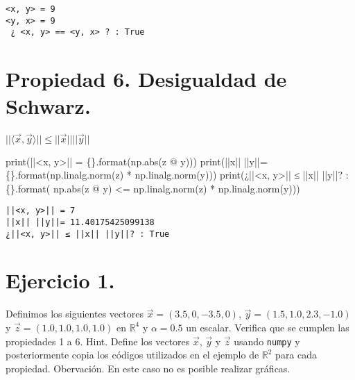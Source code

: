 \documentclass[
  letterpaper,
  DIV=11,
  numbers=noendperiod]{scrreprt}
\newenvironment{Shaded}{\begin{snugshade}}{\end{snugshade}}
\newcommand{\BuiltInTok}[1]{\textcolor[rgb]{0.00,0.23,0.31}{#1}}
\newcommand{\NormalTok}[1]{\textcolor[rgb]{0.00,0.23,0.31}{#1}}
\newcommand{\OperatorTok}[1]{\textcolor[rgb]{0.37,0.37,0.37}{#1}}
\newcommand{\SpecialCharTok}[1]{\textcolor[rgb]{0.37,0.37,0.37}{#1}}
\newcommand{\StringTok}[1]{\textcolor[rgb]{0.13,0.47,0.30}{#1}}
\begin{document}
\begin{verbatim}
<x, y> = 9
<y, x> = 9
 ¿ <x, y> == <y, x> ? : True
\end{verbatim}

\section{Propiedad 6. Desigualdad de
Schwarz.}\label{propiedad-6.-desigualdad-de-schwarz.}

\(||\langle \vec{x}, \vec{y} \rangle|| \le ||\vec{x}|| ||\vec{y}||\)

\begin{Shaded}
\begin{Highlighting}[]
\BuiltInTok{print}\NormalTok{(}\StringTok{\textquotesingle{}||\textless{}x, y\textgreater{}|| = }\SpecialCharTok{\{\}}\StringTok{\textquotesingle{}}\NormalTok{.}\BuiltInTok{format}\NormalTok{(np.}\BuiltInTok{abs}\NormalTok{(z }\OperatorTok{@}\NormalTok{ y)))}
\BuiltInTok{print}\NormalTok{(}\StringTok{\textquotesingle{}||x|| ||y||= }\SpecialCharTok{\{\}}\StringTok{\textquotesingle{}}\NormalTok{.}\BuiltInTok{format}\NormalTok{(np.linalg.norm(z) }\OperatorTok{*}\NormalTok{ np.linalg.norm(y)))}
\BuiltInTok{print}\NormalTok{(}\StringTok{\textquotesingle{}¿||\textless{}x, y\textgreater{}|| ≤ ||x|| ||y||? : }\SpecialCharTok{\{\}}\StringTok{\textquotesingle{}}\NormalTok{.}\BuiltInTok{format}\NormalTok{( np.}\BuiltInTok{abs}\NormalTok{(z }\OperatorTok{@}\NormalTok{ y) }\OperatorTok{\textless{}=}\NormalTok{ np.linalg.norm(z) }\OperatorTok{*}\NormalTok{ np.linalg.norm(y)))}
\end{Highlighting}
\end{Shaded}

\begin{verbatim}
||<x, y>|| = 7
||x|| ||y||= 11.40175425099138
¿||<x, y>|| ≤ ||x|| ||y||? : True
\end{verbatim}

\section{\texorpdfstring{\textbf{Ejercicio
1.}}{Ejercicio 1.}}\label{ejercicio-1.-1}

Definimos los siguientes vectores \(\vec{x} = (3.5, 0, -3.5, 0)\),
\(\vec{y} = (1.5, 1.0, 2.3, -1.0)\) y \(\vec{z} = (1.0, 1.0, 1.0, 1.0)\)
en \(\mathbb{R}^4\) y \(\alpha = 0.5\) un escalar. Verifica que se
cumplen las propiedades 1 a 6. Hint. Define los vectores \(\vec{x}\),
\(\vec{y}\) y \(\vec{z}\) usando \texttt{numpy} y posteriormente copia
los códigos utilizados en el ejemplo de \(\mathbb{R}^2\) para cada
propiedad. Obervación. En este caso no es posible realizar gráficas.
\end{document}
